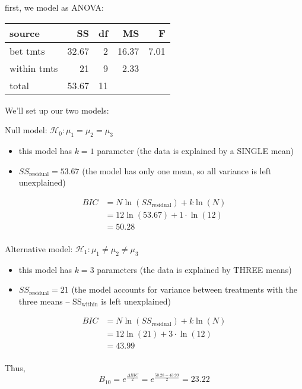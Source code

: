 \documentclass[portrait,footrule,17pt]{foils}
\begin{document}
first, we model as ANOVA:

\begin{center}
\begin{tabular}{lrrrr}
source & SS & df & MS & F\\
\hline
bet tmts & 32.67 & 2 & 16.37 & 7.01\\
within tmts & 21 & 9 & 2.33 & \\
total & 53.67 & 11 &  & \\
\end{tabular}
\end{center}

\foilhead[-1cm]{}
\label{sec:orgb120880}
We'll set up our two models:

Null model: \(\mathcal{H}_0:\mu_1=\mu_2=\mu_3\) 
\begin{itemize}
\item this model has \(k=1\) parameter (the data is explained by a SINGLE mean)
\item \(SS_{\text{residual}} = 53.67\) (the model has only one mean, so all variance is left unexplained)
\end{itemize}

\begin{align*}
BIC &= N\ln (SS_{\text{residual}})+k\ln(N)\\
&= 12\ln(53.67) + 1\cdot \ln(12)\\
&= 50.28\\
\end{align*}

\foilhead[-1cm]{}
\label{sec:org908627b}
Alternative model: \(\mathcal{H}_1:\mu_1 \neq\mu_2 \neq \mu_3\)
\begin{itemize}
\item this model has \(k=3\) parameters (the data is explained by THREE means)
\item \(SS_{\text{residual}} = 21\) (the model accounts for variance between treatments with the three means -- SS\(_{\text{within}}\) is left unexplained)
\end{itemize}

\begin{align*}
BIC &= N\ln (SS_{\text{residual}})+k\ln(N)\\
&= 12\ln(21) + 3\cdot \ln(12)\\
&= 43.99\\
\end{align*}

Thus, 
\[
B_{10} = e^\frac{\Delta BIC}{2} = e^{\frac{50.28-43.99}{2}} = 23.22
\]
\end{document}
